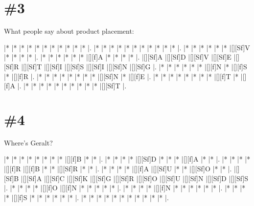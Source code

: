 \documentclass[letterpaper]{article}
\begin{document}
\section*{\#3}
What people say about product placement:
\vspace*{1em}
\begin{Puzzle}{11}{9}
|*        |*        |*        |*        |*        |*        |*        |*        |*        |*        |*        |. 
|*        |*        |*        |*        |*        |*        |*        |*        |*        |*        |*        |.  
|*        |*        |*        |*        |*        |*        |[][Sf]V  |*        |*        |*        |*        |.
|*        |*        |*        |*        |*        |*        |[][f]A   |*        |*        |*        |*        |.  
|[][Sf]A  |[][Sf]D  |[][Sf]V  |[][Sf]E  |[][Sf]R  |[][Sf]T  |[][Sf]I  |[][Sf]S  |[][Sf]I  |[][Sf]N  |[][Sf]G  |.
|*        |*        |*        |*        |*        |*        |[][f]N   |*        |[][f]S   |*        |[][f]R   |. 
|*        |*        |*        |*        |*        |*        |*        |*        |[][Sf]N  |*        |[][f]E   |.
|*        |*        |*        |*        |*        |*        |*        |*        |[][f]T   |*        |[][f]A   |.
|*        |*        |*        |*        |*        |*        |*        |*        |*        |*        |[][Sf]T  |.
\end{Puzzle}


\section*{\#4}
Where's Geralt?
\vspace*{1em}
\begin{Puzzle}{11}{9}
|*        |*        |*        |*        |*        |*        |*        |*        |[][f]B   |*        |*        |. 
|*        |*        |*        |*        |[][Sf]D  |*        |*        |*        |[][f]A   |*        |*        |.  
|*        |*        |*        |*        |[][f]R   |[][f]B   |*        |*        |[][Sf]R  |*        |*        |.
|*        |*        |*        |*        |[][f]A   |[][Sf]U  |*        |*        |[][Sf]O  |*        |*        |.  
|[][Sf]B  |[][Sf]A  |[][Sf]C  |[][Sf]K  |[][Sf]G  |[][Sf]R  |[][Sf]O  |[][Sf]U  |[][Sf]N  |[][Sf]D  |[][Sf]S  |.
|*        |*        |*        |*        |[][f]O   |[][f]N   |*        |*        |*        |*        |*        |. 
|*        |*        |*        |*        |[][f]N   |*        |*        |*        |*        |*        |*        |.
|*        |*        |*        |*        |[][f]S   |*        |*        |*        |*        |*        |*        |.
|*        |*        |*        |*        |*        |*        |*        |*        |*        |*        |*        |.
\end{Puzzle}
\end{document}
